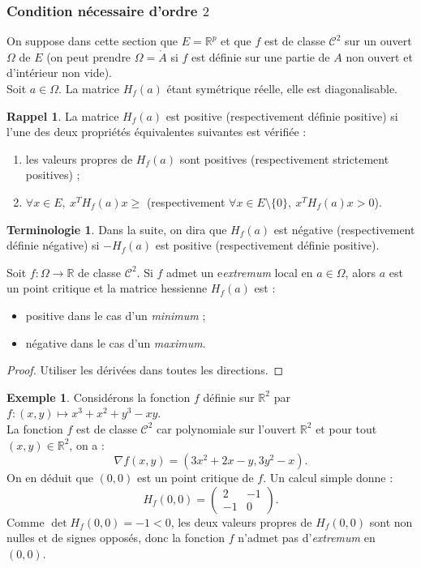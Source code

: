 \documentclass[french]{article}
\newcommand{\R}{\mathbb{R}}
\theoremstyle{plain}
\theoremstyle{definition}
\newtheorem*{ex}{Exemple}
\newtheorem*{rappel}{Rappel}
\newtheorem*{terminologie}{Terminologie}
\theoremstyle{remark}
\begin{document}
\subsubsection*{Condition nécessaire d'ordre $2$}

On suppose dans cette section que $E=\R^p$ et que $f$ est de classe $\mathcal{C}^2$ sur un ouvert $\Omega$ de $E$ (on peut prendre $\Omega=\mathring{A}$ si $f$ est définie sur une partie de $A$ non ouvert et d'intérieur non vide).\\
Soit $a\in\Omega$. La matrice $H_f(a)$ étant symétrique réelle, elle est diagonalisable.

\begin{rappel}
	La matrice $H_f(a)$ est positive (respectivement définie positive) si l'une des deux propriétés équivalentes suivantes est vérifiée :
	\begin{enumerate}[label=(\roman*)]
		\item les valeurs propres de $H_f(a)$ sont positives (respectivement strictement positives) ;
		\item $\forall x\in E,\ x^TH_f(a)x\geqslant$ (respectivement $\forall x\in E\setminus\{0\},\ x^TH_f(a)x>0$).
	\end{enumerate}
\end{rappel}

\begin{terminologie}
	Dans la suite, on dira que $H_f(a)$ est négative (respectivement définie négative) si $-H_f(a)$ est positive (respectivement définie positive).
\end{terminologie}

\begin{prop}%
	Soit $f:\Omega\to\R$ de classe $\mathcal{C}^2$. Si $f$ admet un e\textit{extremum} local en $a\in\Omega$, alors $a$ est un point critique et la matrice hessienne $H_f(a)$ est :
	\begin{itemize}
		\item positive dans le cas d'un \textit{minimum} ;
		\item négative dans le cas d'un \textit{maximum}.
	\end{itemize}
\end{prop}
\begin{proof}
	Utiliser les dérivées dans toutes les directions.
\end{proof}

\begin{ex}
	Considérons la fonction $f$ définie sur $\R^2$ par $f:(x,y)\mapsto x^3+x^2+y^3-xy$. \\
	La fonction $f$ est de classe $\mathcal{C}^2$ car polynomiale sur l'ouvert $\R^2$ et pour tout $(x,y)\in\R^2$, on a :
	$$\nabla f(x,y)=(3x^2+2x-y, 3y^2-x).$$
	On en déduit que $(0,0)$ est un point critique de $f$. Un calcul simple donne :
	$$H_f(0,0)=\begin{pmatrix}
		2&-1\\
		-1&0
	\end{pmatrix}.$$
	Comme $\det H_f(0,0)=-1<0$, les deux valeurs propres de $H_f(0,0)$ sont non nulles et de signes opposés, donc la fonction $f$ n'admet pas d'\textit{extremum} en $(0,0)$.
\end{ex}
\end{document}
